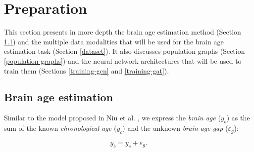 \chapter{Preparation}


This section presents in more depth the brain age estimation method (Section \ref{brain-age-estimation}) and the multiple data modalities that will be used for the brain age estimation task (Section \ref{dataset}). It also discusses population graphs (Section \ref{population-graphs}) and the neural network architectures that will be used to train them (Sections \ref{training-gcn} and \ref{training-gat}).

\section{Brain age estimation}
\label{brain-age-estimation}

Similar to the model proposed in Niu et al. \cite{niu2019improved}, we express the \textit{brain age} ($y_b$) as the sum of the known \textit{chronological age} ($y_c$) and the unknown \textit{brain age gap} ($\varepsilon_g$):

\begin{equation}
    \label{brainage:eq1}
    y_b = y_c + \varepsilon_g.
\end{equation}

